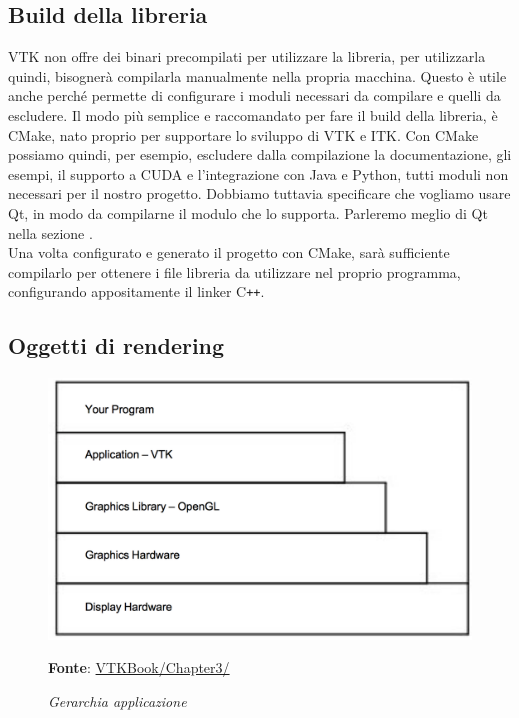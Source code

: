 \subsection{Build della libreria}\label{sec:build-liberia}
VTK non offre dei binari precompilati per utilizzare la libreria, per utilizzarla quindi, bisognerà compilarla manualmente nella propria macchina. Questo è utile anche perché permette di configurare i moduli necessari da compilare e quelli da escludere. Il modo più semplice e raccomandato per fare il build della libreria, è CMake, nato proprio per supportare lo sviluppo di VTK e ITK. Con CMake possiamo quindi, per esempio, escludere dalla compilazione la documentazione, gli esempi, il supporto a CUDA e l'integrazione con Java e Python, tutti moduli non necessari per il nostro progetto. Dobbiamo tuttavia specificare che vogliamo usare Qt, in modo da compilarne il modulo che lo supporta. Parleremo meglio di Qt nella sezione .\\
Una volta configurato e generato il progetto con CMake, sarà sufficiente compilarlo per ottenere i file libreria da utilizzare nel proprio programma, configurando appositamente il linker C\texttt{++}.

\subsection{Oggetti di rendering}\label{sec:oggetti-rendering}
\begin{figure}[h]
    \centering
    \includegraphics[scale=0.4]{immagini/volumerendering/layers.png}
    \caption{\textit{Gerarchia applicazione}}
    \textbf{Fonte}: \href{https://lorensen.github.io/VTKExamples/site/VTKBook/03Chapter3/}{VTKBook/Chapter3/}
    \label{fig: vtk-layers}
\end{figure}

